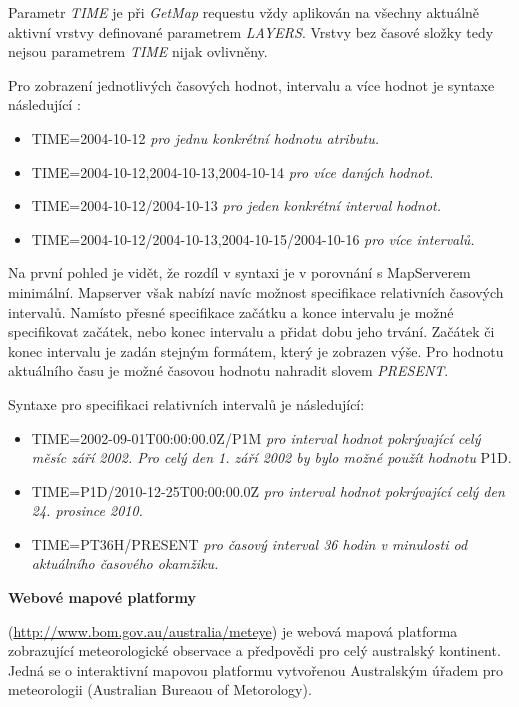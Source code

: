 Parametr \textit{TIME} je při \textit{GetMap} requestu vždy aplikován
na všechny aktuálně aktivní vrstvy definované parametrem
\textit{LAYERS}. Vrstvy bez časové složky tedy nejsou parametrem
\textit{TIME} nijak ovlivněny.

Pro zobrazení jednotlivých časových hodnot, intervalu a více hodnot je
syntaxe následující \cite{geoserver-time}:

\begin{itemize}
	\item TIME=2004-10-12 \textit{pro jednu konkrétní hodnotu
atributu.}
	\item TIME=2004-10-12,2004-10-13,2004-10-14 \textit{pro více
daných hodnot.}
	\item TIME=2004-10-12/2004-10-13 \textit{pro jeden konkrétní
interval hodnot.}
	\item TIME=2004-10-12/2004-10-13,2004-10-15/2004-10-16
\textit{pro více intervalů.}
\end{itemize}

Na první pohled je vidět, že rozdíl v syntaxi je v porovnání s MapServerem 
minimální. Mapserver však nabízí navíc možnost specifikace relativních
časových intervalů. Namísto přesné specifikace začátku a konce
intervalu je možné specifikovat začátek, nebo konec intervalu a přidat
dobu jeho trvání. Začátek či konec intervalu je zadán stejným
formátem, který je zobrazen výše. Pro hodnotu aktuálního času je možné
časovou hodnotu nahradit slovem \textit{PRESENT}.

Syntaxe pro specifikaci relativních intervalů je
následující\cite{geoserver-time}:

\begin{itemize}
	\item TIME=2002-09-01T00:00:00.0Z/P1M \textit{pro interval
hodnot pokrývající celý měsíc září 2002. Pro celý den 1. září
2002 by bylo možné použít hodnotu} P1D.
	\item TIME=P1D/2010-12-25T00:00:00.0Z \textit{pro interval
hodnot pokrývající celý den 24. prosince 2010.}
	\item TIME=PT36H/PRESENT \textit{pro časový interval 36 hodin
v minulosti od aktuálního časového okamžiku.}
\end{itemize}

\bigskip
\noindent \textbf{Webové mapové platformy}

(\url{http://www.bom.gov.au/australia/meteye}) je webová mapová platforma
zobrazující meteorologické observace a předpovědi pro celý australský
kontinent. Jedná se o interaktivní mapovou platformu vytvořenou
Australským úřadem pro meteorologii (Australian Bureaou of Metorology).

